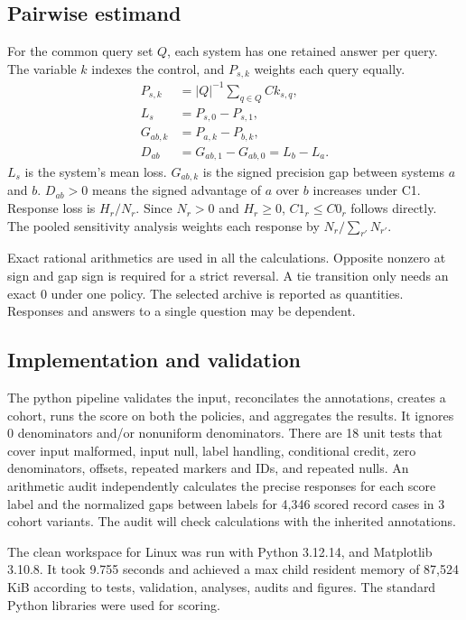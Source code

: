 \documentclass[acmsmall,screen,nonacm]{acmart}
\begin{document}
\subsection{Pairwise estimand}
For the common query set $Q$, each system has one retained answer per query. The variable $k$ indexes the control, and $P_{s,k}$ weights each query equally.
\begin{align}
 P_{s,k}&=|Q|^{-1}\sum_{q\in Q} Ck_{s,q},\\
 L_s&=P_{s,0}-P_{s,1},\\
 G_{ab,k}&=P_{a,k}-P_{b,k},\\
 D_{ab}&=G_{ab,1}-G_{ab,0}=L_b-L_a.
\end{align}
$L_s$ is the system's mean loss. $G_{ab,k}$ is the signed precision gap between systems $a$ and $b$. $D_{ab}>0$ means the signed advantage of $a$ over $b$ increases under C1. Response loss is $H_r/N_r$. Since $N_r>0$ and $H_r\geq0$, $C1_r\leq C0_r$ follows directly. The pooled sensitivity analysis weights each response by $N_r/\sum_{r'}N_{r'}$.

Exact rational arithmetics are used in all the calculations. Opposite nonzero at sign and gap sign is required for a strict reversal. A tie transition only needs an exact 0 under one policy. The selected archive is reported as quantities. Responses and answers to a single question may be dependent.

\subsection{Implementation and validation}
The python pipeline validates the input, reconcilates the annotations, creates a cohort, runs the score on both the policies, and aggregates the results. It ignores 0 denominators and/or nonuniform denominators. There are 18 unit tests that cover input malformed, input null, label handling, conditional credit, zero denominators, offsets, repeated markers and IDs, and repeated nulls. An arithmetic audit independently calculates the precise responses for each score label and the normalized gaps between labels for 4,346 scored record cases in 3 cohort variants. The audit will check calculations with the inherited annotations.

The clean workspace for Linux was run with Python 3.12.14, and Matplotlib 3.10.8. It took 9.755 seconds and achieved a max child resident memory of 87,524 KiB according to tests, validation, analyses, audits and figures. The standard Python libraries were used for scoring.
\end{document}
